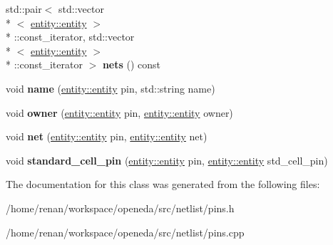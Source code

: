 \begin{DoxyCompactItemize}
\item 
\hypertarget{classophidian_1_1netlist_1_1pins_ac15cbe453588d8f70872b4af3b88b0ad}{std\-::pair$<$ std\-::vector\\*
$<$ \hyperlink{classophidian_1_1entity_1_1entity}{entity\-::entity} $>$\\*
\-::const\-\_\-iterator, std\-::vector\\*
$<$ \hyperlink{classophidian_1_1entity_1_1entity}{entity\-::entity} $>$\\*
\-::const\-\_\-iterator $>$ {\bfseries nets} () const }\label{classophidian_1_1netlist_1_1pins_ac15cbe453588d8f70872b4af3b88b0ad}

\item 
\hypertarget{classophidian_1_1netlist_1_1pins_a3b8bccccc6715c439096fed1fc0ba9d7}{void {\bfseries name} (\hyperlink{classophidian_1_1entity_1_1entity}{entity\-::entity} pin, std\-::string name)}\label{classophidian_1_1netlist_1_1pins_a3b8bccccc6715c439096fed1fc0ba9d7}

\item 
\hypertarget{classophidian_1_1netlist_1_1pins_a6bd2568dc16421a13e9cb89053a3f912}{void {\bfseries owner} (\hyperlink{classophidian_1_1entity_1_1entity}{entity\-::entity} pin, \hyperlink{classophidian_1_1entity_1_1entity}{entity\-::entity} owner)}\label{classophidian_1_1netlist_1_1pins_a6bd2568dc16421a13e9cb89053a3f912}

\item 
\hypertarget{classophidian_1_1netlist_1_1pins_a32688650533a13614a51c43eca20f048}{void {\bfseries net} (\hyperlink{classophidian_1_1entity_1_1entity}{entity\-::entity} pin, \hyperlink{classophidian_1_1entity_1_1entity}{entity\-::entity} net)}\label{classophidian_1_1netlist_1_1pins_a32688650533a13614a51c43eca20f048}

\item 
\hypertarget{classophidian_1_1netlist_1_1pins_afe613b9cb71c2ad677e8e2367b8a5984}{void {\bfseries standard\-\_\-cell\-\_\-pin} (\hyperlink{classophidian_1_1entity_1_1entity}{entity\-::entity} pin, \hyperlink{classophidian_1_1entity_1_1entity}{entity\-::entity} std\-\_\-cell\-\_\-pin)}\label{classophidian_1_1netlist_1_1pins_afe613b9cb71c2ad677e8e2367b8a5984}

\end{DoxyCompactItemize}


The documentation for this class was generated from the following files\-:\begin{DoxyCompactItemize}
\item 
/home/renan/workspace/openeda/src/netlist/pins.\-h\item 
/home/renan/workspace/openeda/src/netlist/pins.\-cpp\end{DoxyCompactItemize}

